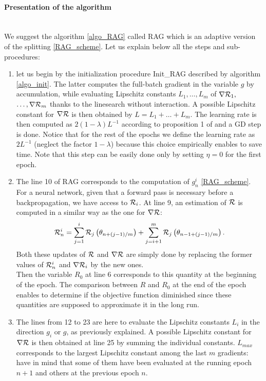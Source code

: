\paragraph{Presentation of the algorithm}
~~\\
We suggest the algorithm \ref{algo_RAG} called RAG which is an adaptive version of the splitting \eqref{RAG_scheme}. Let us explain below all the steps and sub-procedures:
\begin{enumerate}
	\item let us begin by the initialization procedure Init\_RAG described by algorithm \ref{algo_init}. The latter computes the full-batch gradient in the variable $g$ by accumulation, while evaluating Lipschitz constants $L_1, \dots, L_m$ of 
	$\nabla \mathcal{R}_1,$ $\dots, \nabla \mathcal{R}_m$ thanks to the linesearch without interaction. A possible Lipschitz constant for $\nabla \mathcal{R}$ is then obtained by $L=L_1+\dots+L_m$. The learning rate is then computed as $2(1-\lambda)L^{-1}$ according to proposition 1 of \cite{Lyap_Theory_Bilel} and a GD step is done. Notice that for the rest of the epochs we define the learning rate as $2L^{-1}$ (neglect the factor $1-\lambda$) because this choice empirically enables to save time.
        Note that this step can be easily done only by setting $\eta=0$ for the first epoch. 
	\item The line 10 of RAG corresponds to the computation of $g_n^i$ \eqref{RAG_scheme}. For a neural network, given that a forward pass is necessary before a backpropagation, we have access to $\mathcal{R}_i$. At line 9, an estimation of $\mathcal{R}$ is computed in a similar way as the one for $\nabla \mathcal{R}$:
	\begin{equation}
		\mathcal{R}_n^i = \sum_{j=1}^i \mathcal{R}_j\left(\theta_{n+(j-1)/m}\right)+\sum_{j=i+1}^m \mathcal{R}_j\left(\theta_{n-1+(j-1)/m}\right).
		\label{Rni}
	\end{equation}
        Both these updates of $\mathcal{R}$ and $\nabla \mathcal{R}$ are simply done by replacing the former values of $\mathcal{R}_n^i$ and $\nabla \mathcal{R}_i$ by the new ones.\\
	Then the variable $R_0$ at line 6 corresponds to this quantity at the beginning of the epoch. The comparison between $R$ and $R_0$ at the end of the epoch enables to determine if the objective function diminished since these quantities are supposed to approximate it in the long run. 
	\item The lines from 12 to 23 are here to evaluate the Lipschitz constants $L_i$ in the direction $g_i$ or $g$, as previously explained. A possible Lipschitz constant for $\nabla \mathcal{R}$ is then obtained at line 25 by summing the individual constants. $L_{max}$ corresponds to the largest Lipschitz constant among the last $m$ gradients: have in mind that some of them have been evaluated at the running epoch $n+1$ and others at the previous epoch $n$.

\end{enumerate}
